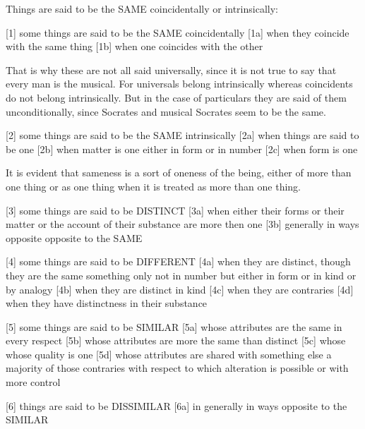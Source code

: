 
Things are said to be the SAME coincidentally or intrinsically:

[1]     some things are said to be the SAME coincidentally
[1a]    when they coincide with the same thing
[1b]    when one coincides with the other

        That is why these are not all said universally,
        since it is not true to say that every man is the musical.
        For universals belong intrinsically whereas coincidents do not belong intrinsically.
        But in the case of particulars they are said of them unconditionally,
        since Socrates and musical Socrates seem to be the same.

[2]     some things are said to be the SAME intrinsically
[2a]    when things are said to be one
[2b]    when matter is one either in form or in number
[2c]    when form is one

        It is evident that sameness is a sort of oneness of the being,
        either of more than one thing or as one thing when it is treated as
        more than one thing.

[3]     some things are said to be DISTINCT
[3a]    when either their forms or their matter or
        the account of their substance are more then one
[3b]    generally in ways opposite opposite to the SAME

[4]     some things are said to be DIFFERENT
[4a]    when they are distinct, though they are the same something
        only not in number but either in form or in kind or by analogy
[4b]    when they are distinct in kind
[4c]    when they are contraries
[4d]    when they have distinctness in their substance

[5]     some things are said to be SIMILAR
[5a]    whose attributes are the same in every respect
[5b]    whose attributes are more the same than distinct
[5c]    whose whose quality is one
[5d]    whose attributes are shared with something else
        a majority of those contraries with respect to which
        alteration is possible or with more control

[6]     things are said to be DISSIMILAR
[6a]    in generally in ways opposite to the SIMILAR
